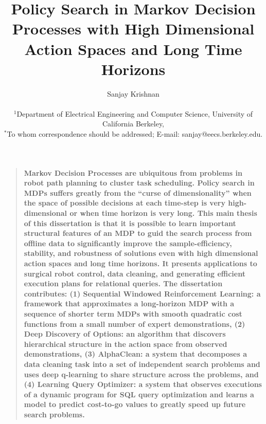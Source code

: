 \documentclass[11pt]{book}
\title{Policy Search in Markov Decision Processes with High Dimensional Action Spaces and Long Time Horizons}
\author
{Sanjay Krishnan\\
\\
\normalsize{$^{1}$Department of Electrical Engineering and Computer Science, University of California Berkeley,}\\
\normalsize{$^\ast$To whom correspondence should be addressed; E-mail:  sanjay@eecs.berkeley.edu.}
}
\date{}
\newenvironment{sciabstract}{%
\begin{quote} \bf}
{\end{quote}}
\begin{document}
 


\baselineskip26pt


\maketitle 





\begin{sciabstract}
Markov Decision Processes are ubiquitous from problems in robot path planning to cluster task scheduling. 
Policy search in MDPs suffers greatly from the ``curse of dimensionality'' when the space of possible decisions at each time-step is very high-dimensional or when time horizon is very long. 
This main thesis of this dissertation is that it is possible to learn important structural features of an MDP to guid the search process from offline data to significantly improve the sample-efficiency, stability, and robustness of solutions even with high dimensional action spaces and long time horizons.
It presents applications to surgical robot control, data cleaning, and generating efficient execution plans for relational queries. 
The dissertation contributes: (1) Sequential Windowed Reinforcement Learning: a framework that approximates a long-horizon MDP with a sequence of shorter term MDPs with smooth quadratic cost functions from a small number of expert demonstrations, (2) Deep Discovery of Options: an algorithm that discovers hierarchical structure in the action space from observed demonstrations, (3) AlphaClean: a system that decomposes a data cleaning task into a set of independent search problems and uses deep q-learning to share structure across the problems, and (4) Learning Query Optimizer: a system that observes executions of a dynamic program for SQL query optimization and learns a model to predict cost-to-go values to greatly speed up future search problems. 
\end{sciabstract}


\clearpage

\tableofcontents

\clearpage
\end{document}
